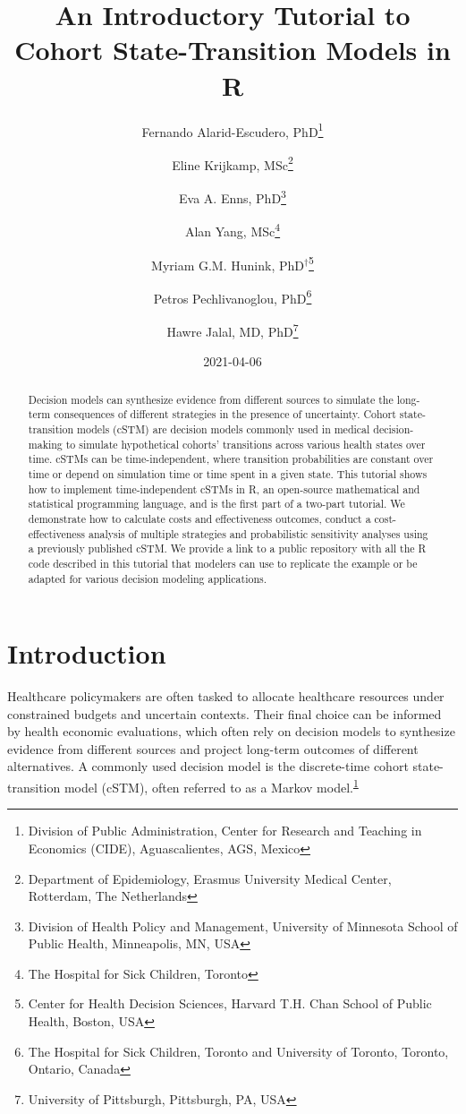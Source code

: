 \documentclass[
]{article}
\title{An Introductory Tutorial to Cohort State-Transition Models in R}
\author{Fernando Alarid-Escudero, PhD\footnote{Division of Public Administration, Center for Research and Teaching in Economics (CIDE), Aguascalientes, AGS, Mexico} \and Eline Krijkamp, MSc\footnote{Department of Epidemiology, Erasmus University Medical Center, Rotterdam, The Netherlands} \and Eva A. Enns, PhD\footnote{Division of Health Policy and Management, University of Minnesota School of Public Health, Minneapolis, MN, USA} \and Alan Yang, MSc\footnote{The Hospital for Sick Children, Toronto} \and Myriam G.M. Hunink, PhD\(^\dagger\)\footnote{Center for Health Decision Sciences, Harvard T.H. Chan School of Public Health, Boston, USA} \and Petros Pechlivanoglou, PhD\footnote{The Hospital for Sick Children, Toronto and University of Toronto, Toronto, Ontario, Canada} \and Hawre Jalal, MD, PhD\footnote{University of Pittsburgh, Pittsburgh, PA, USA}}
\date{2021-04-06}
\begin{document}
\maketitle
\begin{abstract}
Decision models can synthesize evidence from different sources to simulate the long-term consequences of different strategies in the presence of uncertainty. Cohort state-transition models (cSTM) are decision models commonly used in medical decision-making to simulate hypothetical cohorts' transitions across various health states over time. cSTMs can be time-independent, where transition probabilities are constant over time or depend on simulation time or time spent in a given state. This tutorial shows how to implement time-independent cSTMs in R, an open-source mathematical and statistical programming language, and is the first part of a two-part tutorial. We demonstrate how to calculate costs and effectiveness outcomes, conduct a cost-effectiveness analysis of multiple strategies and probabilistic sensitivity analyses using a previously published cSTM. We provide a link to a public repository with all the R code described in this tutorial that modelers can use to replicate the example or be adapted for various decision modeling applications.
\end{abstract}

{
\setcounter{tocdepth}{2}
\tableofcontents
}
\hypertarget{introduction}{%
\section{Introduction}\label{introduction}}

Healthcare policymakers are often tasked to allocate healthcare resources under constrained budgets and uncertain contexts. Their final choice can be informed by health economic evaluations, which often rely on decision models to synthesize evidence from different sources and project long-term outcomes of different alternatives. A commonly used decision model is the discrete-time cohort state-transition model (cSTM), often referred to as a Markov model.\textsuperscript{\protect\hyperlink{ref-Kuntz2017}{1}}
\end{document}
